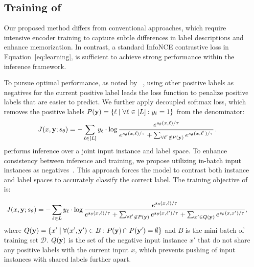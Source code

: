 \subsection{Training of \RAEXMC}
\label{sec:rae-training}

Our proposed method differs from conventional approaches, which require intensive encoder training to capture subtle differences in label descriptions and enhance memorization. 
In contrast, a standard InfoNCE contrastive loss in Equation~\ref{eq:learning}, is sufficient to achieve strong performance within the \RAEXMC inference framework. 

To pursue optimal performance, as noted by \DEXML~\citep{gupta2024dual}, using other positive labels as negatives for the current positive label leads the loss function to penalize positive labels that are easier to predict.
We further apply decoupled softmax loss, which removes the positive labels $P({\mathbf{y}})=\{ \ell  \mid  \forall \ell \in [L]: y_{\ell}=1 \}$ from the denominator:
\begin{equation}
    J(x, {\mathbf{y}}; s_{\theta}) =
    - \sum_{\ell \in [L]}  y_{\ell} \cdot \log
    \frac{ e^{s_{\theta}(x,\ell)/\tau} }
    {e^{s_{\theta}(x,\ell)/\tau} + \sum_{\forall \ell^{'} \not\in P({\mathbf{y}})} e^{s_{\theta}(x,\ell^{'})/\tau} }.
    \label{eq:in-batch}
\end{equation}
\RAEXMC performs inference over a joint input instance and label space. 
To enhance consistency between inference and training, we propose utilizing in-batch input instances as negatives~\citep{moiseev2023samtone}. 
This approach forces the model to contrast both instance and label spaces to accurately classify the correct label. 
The training objective of \RAEXMC{} is:


\begin{equation}
    J(x, {\mathbf{y}}; s_{\theta}) =
    - \sum_{\ell \in L}  y_{\ell} \cdot \log
    \frac{ e^{s_{\theta}(x,\ell)/\tau } }
    {e^{s_{\theta}(x,\ell)/\tau} + \sum_{ \forall \ell^{'} \not\in P({\mathbf{y}})}e^{s_{\theta}(x,\ell')/\tau} + \sum_{x' \in Q({\mathbf{y}})} e^{s_{\theta}(x, x')/\tau}},
\end{equation}
where $Q({\mathbf{y}}) = \{ x'  \mid  \forall (x', {\mathbf{y}}') \in B : P({\mathbf{y}}) \cap P({\mathbf{y}}')=\emptyset\}$ and $B$ is the mini-batch of training set $\mathcal{D}$. 
$Q({\mathbf{y}})$ is the set of the negative input instance $x'$ that do not share any positive labels with the current input $x$, which prevents pushing of input instances with shared labels further apart.

